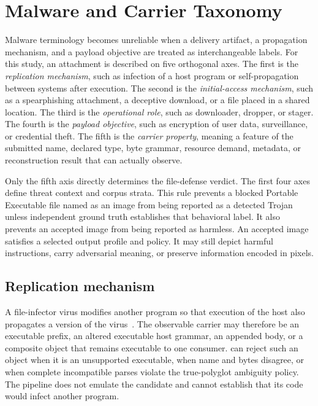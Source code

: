 \section{Malware and Carrier Taxonomy}\label{sec:malware-taxonomy}

Malware terminology becomes unreliable when a delivery artifact, a propagation
mechanism, and a payload objective are treated as interchangeable labels. For
this study, an attachment is described on five orthogonal axes. The first is
the \emph{replication mechanism}, such as infection of a host program or
self-propagation between systems after execution. The second is the \emph{initial-access
mechanism}, such as a spearphishing attachment, a deceptive download, or a file
placed in a shared location. The third is the \emph{operational role}, such as
downloader, dropper, or stager. The fourth is the \emph{payload objective}, such
as encryption of user data, surveillance, or credential theft. The fifth is
the \emph{carrier property}, meaning a feature of the submitted name, declared
type, byte grammar, resource demand, metadata, or reconstruction result that
\AFD{} can actually observe.

Only the fifth axis directly determines the file-defense verdict. The first
four axes define threat context and corpus strata. This rule prevents a
blocked Portable Executable file named as an image from being reported as a
detected Trojan unless independent ground truth establishes that behavioral
label. It also prevents an accepted image from being reported as harmless. An
accepted image satisfies a selected output profile and policy. It may still
depict harmful instructions, carry adversarial meaning, or preserve information
encoded in pixels.

\subsection{Replication mechanism}

A file-infector virus modifies another program so that execution of the host
also propagates a version of the virus~\cite{cohen1987}. The observable carrier
may therefore be an executable prefix, an altered executable host grammar, an
appended body, or a composite object that remains executable to one consumer.
\AFD{} can reject such an object when it is an unsupported executable, when name
and bytes disagree, or when complete incompatible parses violate the
true-polyglot ambiguity policy. The pipeline does not emulate the candidate and
cannot establish that its code would infect another program.

